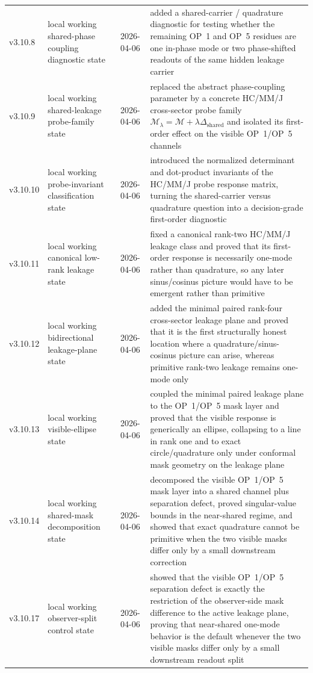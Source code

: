 {\begin{longtable}{|p{}|p{}|p{}|p{}|}
v3.10.8 & local working shared-phase coupling diagnostic state & 2026-04-06 & added a shared-carrier / quadrature diagnostic for testing whether the remaining OP~1 and OP~5 residues are one in-phase mode or two phase-shifted readouts of the same hidden leakage carrier \\
v3.10.9 & local working shared-leakage probe-family state & 2026-04-06 & replaced the abstract phase-coupling parameter by a concrete HC/MM/J cross-sector probe family $\mathcal M_\lambda=\mathcal M+\lambda\Delta_{\mathrm{shared}}$ and isolated its first-order effect on the visible OP~1/OP~5 channels \\
v3.10.10 & local working probe-invariant classification state & 2026-04-06 & introduced the normalized determinant and dot-product invariants of the HC/MM/J probe response matrix, turning the shared-carrier versus quadrature question into a decision-grade first-order diagnostic \\
v3.10.11 & local working canonical low-rank leakage state & 2026-04-06 & fixed a canonical rank-two HC/MM/J leakage class and proved that its first-order response is necessarily one-mode rather than quadrature, so any later sinus/cosinus picture would have to be emergent rather than primitive \\
v3.10.12 & local working bidirectional leakage-plane state & 2026-04-06 & added the minimal paired rank-four cross-sector leakage plane and proved that it is the first structurally honest location where a quadrature/sinus-cosinus picture can arise, whereas primitive rank-two leakage remains one-mode only \\
  v3.10.13 & local working visible-ellipse state & 2026-04-06 & coupled the minimal paired leakage plane to the OP~1/OP~5 mask layer and proved that the visible response is generically an ellipse, collapsing to a line in rank one and to exact circle/quadrature only under conformal mask geometry on the leakage plane \\
  v3.10.14 & local working shared-mask decomposition state & 2026-04-06 & decomposed the visible OP~1/OP~5 mask layer into a shared channel plus separation defect, proved singular-value bounds in the near-shared regime, and showed that exact quadrature cannot be primitive when the two visible masks differ only by a small downstream correction \\
  v3.10.17 & local working observer-split control state & 2026-04-06 & showed that the visible OP~1/OP~5 separation defect is exactly the restriction of the observer-side mask difference to the active leakage plane, proving that near-shared one-mode behavior is the default whenever the two visible masks differ only by a small downstream readout split \\

\end{longtable}}

